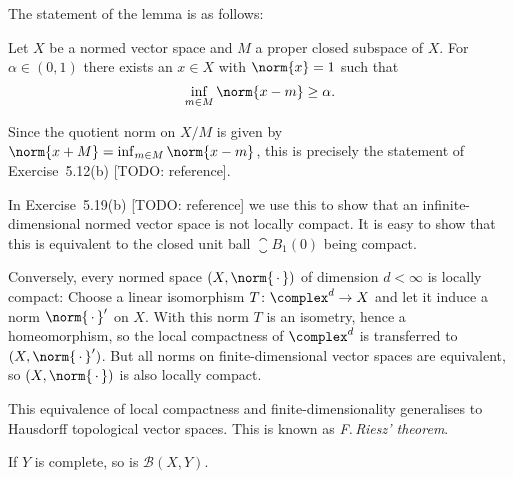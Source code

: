 \documentclass[article, a4paper, 11pt, oneside]{memoir}
\numberwithin{equation}{chapter}
\newcommand{\calB}{\mathcal{B}}
\newenvironment{displaytheorem}{%
	\begin{displayquote}\itshape%
}{%
	\end{displayquote}%
}
\theoremstyle{nonumberplain}
\begin{document}
\begin{remarkbreak}
	The statement of the lemma is as follows:
	\begin{displaytheorem}
		Let $X$ be a normed vector space and $M$ a proper closed subspace of $X$. For $\alpha \in (0,1)$ there exists an $x \in X$ with $\norm{x} = 1$ such that
		\begin{equation*}
			\inf_{m \in M} \norm{x - m} \geq \alpha.
		\end{equation*}
	\end{displaytheorem}
	Since the quotient norm on $X/M$ is given by $\norm{x+M} = \inf_{m \in M} \norm{x-m}$, this is precisely the statement of Exercise~5.12(b) [TODO: reference].

	In Exercise~5.19(b) [TODO: reference] we use this to show that an infinite-dimensional normed vector space is not locally compact. It is easy to show that this is equivalent to the closed unit ball $\closure{B}_1(0)$ being compact.
	
	Conversely, every normed space $(X, \norm{\,\cdot\,})$ of dimension $d < \infty$ is locally compact: Choose a linear isomorphism $T \colon \complex^d \to X$ and let it induce a norm $\norm{\,\cdot\,}'$ on $X$. With this norm $T$ is an isometry, hence a homeomorphism, so the local compactness of $\complex^d$ is transferred to $(X, \norm{\,\cdot\,}')$. But all norms on finite-dimensional vector spaces are equivalent, so $(X, \norm{\,\cdot\,})$ is also locally compact.

	This equivalence of local compactness and finite-dimensionality generalises to Hausdorff topological vector spaces. This is known as \emph{F.\,Riesz' theorem}.
\end{remarkbreak}


\begin{exerciseframed*}[3]
	If $Y$ is complete, so is $\calB(X,Y)$.
\end{exerciseframed*}
\end{document}

